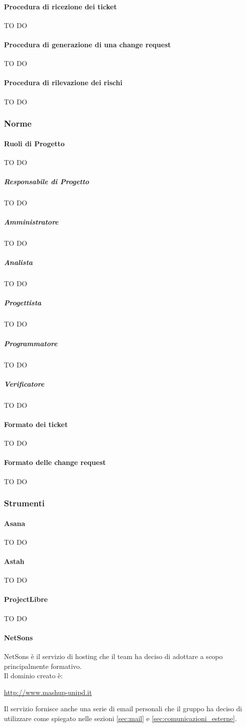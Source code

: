 			\paragraph{Procedura di ricezione dei ticket}
TO DO
			\paragraph{Procedura di generazione di una change request}
TO DO
			\paragraph{Procedura di rilevazione dei rischi}
TO DO
		\subsubsection{Norme}
			\paragraph{Ruoli di Progetto}
TO DO
				\subparagraph{Responsabile di Progetto}
TO DO
				\subparagraph{Amministratore}
TO DO
				\subparagraph{Analista}
TO DO
				\subparagraph{Progettista}
TO DO
				\subparagraph{Programmatore}
TO DO
				\subparagraph{Verificatore}
TO DO
			
			\paragraph{Formato dei ticket}
TO DO			
			\paragraph{Formato delle change request}
TO DO	
	
		\subsubsection{Strumenti}
			\paragraph{Asana} \label{sec:Asana}
TO DO
			\paragraph{Astah}
TO DO
			\paragraph{ProjectLibre}
TO DO
			\paragraph{NetSons}
NetSons è il servizio di hosting che il team ha deciso di adottare a scopo principalmente formativo. \\
Il dominio creato è:
				\begin{center}
					\url{http://www.mashup-unipd.it}
				\end{center}
Il servizio fornisce anche una serie di email personali che il gruppo ha deciso di utilizzare come spiegato nelle sezioni \ref{sec:mail} e \ref{sec:comunicazioni_esterne}.
